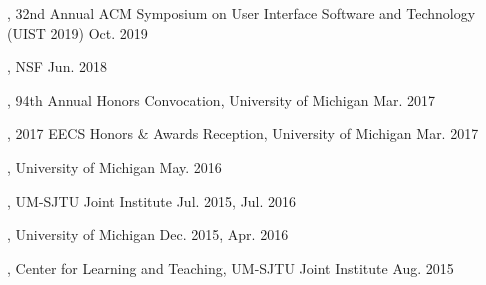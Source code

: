 
\begin{cvhonors}
  \cvhonor
    {, 32nd Annual ACM Symposium on User Interface Software and Technology (UIST 2019)} %
    {Oct. 2019} %
  \end{cvhonors}

\begin{cvhonors}
  \cvhonor
    {, NSF} %
    {Jun. 2018} %
\end{cvhonors}

\begin{cvhonors}
  \cvhonor
    {, 94th Annual Honors Convocation, University of Michigan} %
    {Mar. 2017} %
  \end{cvhonors}

\begin{cvhonors}
  \cvhonor
    {, 2017 EECS Honors \& Awards Reception, University of Michigan} %
    {Mar. 2017} %
  \end{cvhonors}

\begin{cvhonors}
  \cvhonor
    {, University of Michigan} %
    {May. 2016} %
  \end{cvhonors}

\begin{cvhonors}
  \cvhonor
    {, UM-SJTU Joint Institute} %
    {Jul. 2015, Jul. 2016} %
  \end{cvhonors}

\begin{cvhonors}    
  \cvhonor
    {, University of Michigan} %
    {Dec. 2015, Apr. 2016} %
  \end{cvhonors}

\begin{cvhonors}
    \cvhonor
    {, Center for Learning and Teaching, UM-SJTU Joint Institute} %
    {Aug. 2015} %
  \end{cvhonors}

